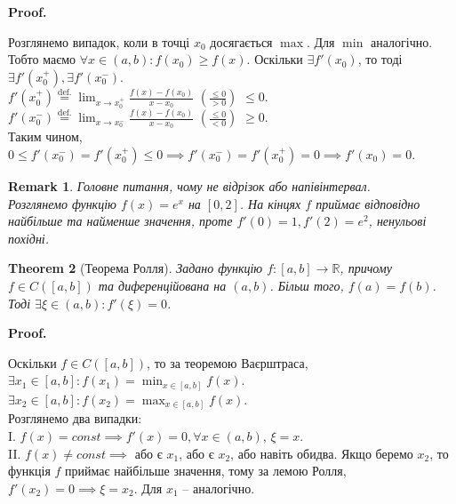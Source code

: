 \documentclass[a4paper, 14pt]{article}
\makeatletter
\def\qed{$\blacksquare$}
\theoremstyle{theoremdd}
\newtheorem{theorem}{Theorem}[subsection]
\theoremstyle{theoremdd}
\theoremstyle{theoremdd}
\theoremstyle{theoremdd}
\theoremstyle{theoremdd}
\theoremstyle{theoremdd}
\newtheorem{remark}[theorem]{Remark}
\theoremstyle{theoremdd}
\theoremstyle{theoremdd}
\renewenvironment{proof}[1][Proof.\\]{\par
\pushQED{\hfill \qed}%
\normalfont \topsep6\p@\@plus6\p@\relax
\trivlist
\item\relax
{\bfseries
#1\@addpunct{.}}\hspace\labelsep\ignorespaces
}{%
\popQED\endtrivlist\@endpefalse
}
\makeatother
\begin{document}
\begin{proof}
Розглянемо випадок, коли в точці $x_0$ досягається $\max$. Для $\min$ аналогічно.\\
Тобто маємо $\forall x \in (a,b): f(x_0) \geq f(x)$. Оскільки $\exists f'(x_0)$, то тоді $\exists f'(x_0^+), \exists f'(x_0^-)$.\\
$f'(x_0^+) \displaystyle \overset{\textrm{def.}}{=} \lim_{x \to x_0^+} \frac{f(x)-f(x_0)}{x-x_0}$  $\left( \frac{\leq 0}{> 0} \right)$ $\leq 0$.\\
$f'(x_0^-) \displaystyle \overset{\textrm{def.}}{=} \lim_{x \to x_0^-} \frac{f(x)-f(x_0)}{x-x_0}$ $\left( \frac{\leq 0}{< 0} \right)$ $\geq 0$.\\
Таким чином, $0 \leq f'(x_0^-) = f'(x_0^+) \leq 0 \implies f'(x_0^-) = f'(x_0^+) = 0 \implies f'(x_0) = 0$.
\\ \iffalse %
\begin{figure}[H]
\centering
\begin{tikzpicture}
\draw[thick,->] (2,0)--(5,0) node[anchor = north west] {$x$};
\draw[thick, domain=3:4.7, variable=\x, samples = 100] plot({\x}, {-(4-\x)^2 + 2});
\draw (3,-1pt)--(3,1pt) node [anchor = north] {$a$};
\draw (4.7,-1pt)--(4.7,1pt) node [anchor = north] {$b$};
\draw [dashed] (4,2)--(4,0) node [anchor = north] {$x_0$};
\draw [thick, red] (3.5,2)--(4.5,2) node [anchor = south, black] {$f'(x_0) = 0$};
\end{tikzpicture}
\end{figure}
\fi %
\end{proof}

\begin{remark}
Головне питання, чому не відрізок або напівінтервал.\\
Розглянемо функцію $f(x) = e^x$ на $[0,2]$. На кінцях $f$ приймає відповідно найбільше та найменше значення, проте $f'(0) = 1, f'(2) = e^2$, ненульові похідні.
\end{remark}

\begin{theorem}[Теорема Ролля]
Задано функцію $f \colon [a,b] \to \mathbb{R}$, причому $f \in C([a,b])$ та диференційована на $(a,b)$. Більш того, $f(a) = f(b)$. Тоді $\exists \xi \in (a,b): f'(\xi) = 0$.
\end{theorem}

\begin{proof}
Оскільки $f \in C([a,b])$, то за теоремою Ваєрштраса,\\
$\exists x_1 \in [a,b]: f(x_1) = \displaystyle \min_{x \in [a,b]} f(x)$.\\
$\exists x_2 \in [a,b]: f(x_2) = \displaystyle \max_{x \in [a,b]} f(x)$.\\
Розглянемо два випадки:\\
I. $f(x) = const \implies f'(x) = 0, \forall x \in (a,b)$, $\xi = x$.\\
II. $f(x) \neq const \implies$ або є $x_1$, або є $x_2$, або навіть обидва. Якщо беремо $x_2$, то функція $f$ приймає найбільше значення, тому за лемою Ролля, $f'(x_2) = 0 \implies \xi = x_2$. Для $x_1$ -- аналогічно.
\end{proof}
\end{document}
